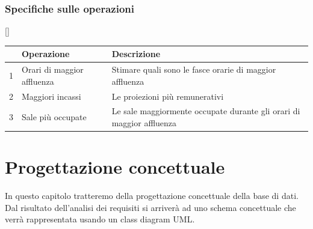 \documentclass[12pt,a4paper]{book}
\begin{document}
	\subsection{Specifiche sulle operazioni}
	\begin{center}[]
		\begin{tabular}{ l | p{5cm} | p{9cm} |}
			\cline{2-3}
			& \textbf{Operazione}        & \textbf{Descrizione}                                                 \\ \hline
			\multicolumn{1}{|l|}{1} & Orari di maggior affluenza & Stimare quali sono le fasce orarie di maggior affluenza              \\ \hline
			\multicolumn{1}{|l|}{2} & Maggiori incassi           & Le proiezioni più remunerativi                                       \\ \hline
			\multicolumn{1}{|l|}{3} & Sale più occupate          & Le sale maggiormente occupate durante gli orari di maggior affluenza \\ \hline
		\end{tabular}
	\end{center}

	\chapter{Progettazione concettuale}
	In questo capitolo tratteremo della progettazione concettuale della base di dati.
	Dal risultato dell'analisi dei requisiti si arriverà ad uno schema concettuale che verrà rappresentata usando un class diagram UML.
\end{document}
